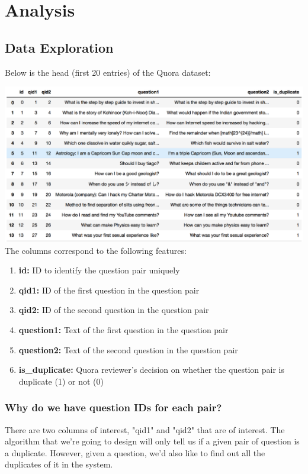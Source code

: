 \documentclass{article}
\begin{document}
\newpage
\section{Analysis}

\subsection{Data Exploration}

Below is the head (first 20 entries) of the Quora dataset:

\noindent\includegraphics[width=\textwidth]{data_head}
The columns correspond to the following features:

\begin{enumerate}
\item{\textbf{id:} ID to identify the question pair uniquely}
\item{\textbf{qid1:} ID of the first question in the question pair}
\item{\textbf{qid2:} ID of the second question in the question pair}
\item{\textbf{question1:} Text of the first question in the question pair}
\item{\textbf{question2:} Text of the second question in the question pair}
\item{\textbf{is\_duplicate:} Quora reviewer's decision on whether the question pair is duplicate (1) or not (0)}
\end{enumerate}

\subsubsection{Why do we have question IDs for each pair?}
There are two columns of interest, "qid1" and "qid2" that are of interest. The algorithm that we're going to design will only tell us if a given pair of question is a duplicate. However, given a question, we'd also like to find out all the duplicates of it in the system.
\end{document}
